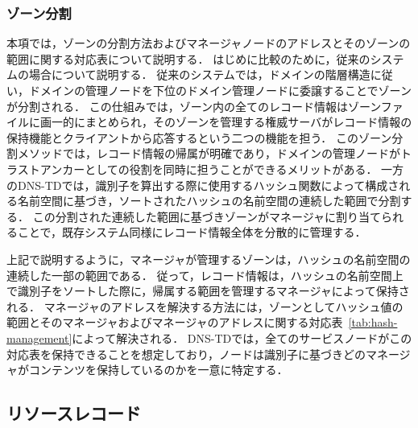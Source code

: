 \subsubsection{ゾーン分割}
本項では，ゾーンの分割方法およびマネージャノードのアドレスとそのゾーンの範囲に関する対応表について説明する．
はじめに比較のために，従来のシステムの場合について説明する．
従来のシステムでは，ドメインの階層構造に従い，ドメインの管理ノードを下位のドメイン管理ノードに委譲することでゾーンが分割される．
この仕組みでは，ゾーン内の全てのレコード情報はゾーンファイルに画一的にまとめられ，そのゾーンを管理する権威サーバがレコード情報の保持機能とクライアントから応答するという二つの機能を担う．
このゾーン分割メソッドでは，レコード情報の帰属が明確であり，ドメインの管理ノードがトラストアンカーとしての役割を同時に担うことができるメリットがある．
一方のDNS-TDでは，識別子を算出する際に使用するハッシュ関数によって構成される名前空間に基づき，ソートされたハッシュの名前空間の連続した範囲で分割する．
この分割された連続した範囲に基づきゾーンがマネージャに割り当てられることで，既存システム同様にレコード情報全体を分散的に管理する．

上記で説明するように，マネージャが管理するゾーンは，ハッシュの名前空間の連続した一部の範囲である．
従って，レコード情報は，ハッシュの名前空間上で識別子をソートした際に，帰属する範囲を管理するマネージャによって保持される．
マネージャのアドレスを解決する方法には，ゾーンとしてハッシュ値の範囲とそのマネージャおよびマネージャのアドレスに関する対応表~\ref{tab:hash-management}によって解決される．
DNS-TDでは，全てのサービスノードがこの対応表を保持できることを想定しており，ノードは識別子に基づきどのマネージャがコンテンツを保持しているのかを一意に特定する．


\newpage
\subsection{リソースレコード}
